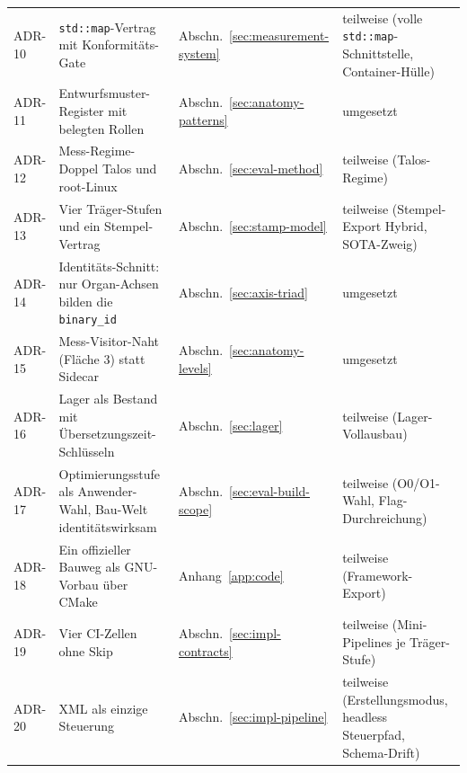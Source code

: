 \begin{footnotesize}
\begin{longtable}{@{}>{\raggedright\arraybackslash}p{1.3cm}>{\raggedright\arraybackslash}p{6.0cm}>{\raggedright\arraybackslash}p{3.3cm}>{\raggedright\arraybackslash}p{3.8cm}@{}}
ADR-10 & \texttt{std::map}-Vertrag mit Konformitäts-Gate & Abschn.~\ref{sec:measurement-system} & teilweise (volle \texttt{std::map}-Schnittstelle, Container-Hülle) \\
ADR-11 & Entwurfsmuster-Register mit belegten Rollen & Abschn.~\ref{sec:anatomy-patterns} & umgesetzt \\
ADR-12 & Mess-Regime-Doppel Talos und root-Linux & Abschn.~\ref{sec:eval-method} & teilweise (Talos-Regime) \\
ADR-13 & Vier Träger-Stufen und ein Stempel-Vertrag & Abschn.~\ref{sec:stamp-model} & teilweise (Stempel-Export Hybrid, SOTA-Zweig) \\
ADR-14 & Identitäts-Schnitt: nur Organ-Achsen bilden die \texttt{binary\_id} & Abschn.~\ref{sec:axis-triad} & umgesetzt \\
ADR-15 & Mess-Visitor-Naht (Fläche 3) statt Sidecar & Abschn.~\ref{sec:anatomy-levels} & umgesetzt \\
ADR-16 & Lager als Bestand mit Übersetzungszeit-Schlüsseln & Abschn.~\ref{sec:lager} & teilweise (Lager-Vollausbau) \\
ADR-17 & Optimierungsstufe als Anwender-Wahl, Bau-Welt identitätswirksam & Abschn.~\ref{sec:eval-build-scope} & teilweise (O0/O1-Wahl, Flag-Durchreichung) \\
ADR-18 & Ein offizieller Bauweg als GNU-Vorbau über CMake & Anhang~\ref{app:code} & teilweise (Framework-Export) \\
ADR-19 & Vier CI-Zellen ohne Skip & Abschn.~\ref{sec:impl-contracts} & teilweise (Mini-Pipelines je Träger-Stufe) \\
ADR-20 & XML als einzige Steuerung & Abschn.~\ref{sec:impl-pipeline} & teilweise (Erstellungsmodus, headless Steuerpfad, Schema-Drift) \\
\end{longtable}
\end{footnotesize}

